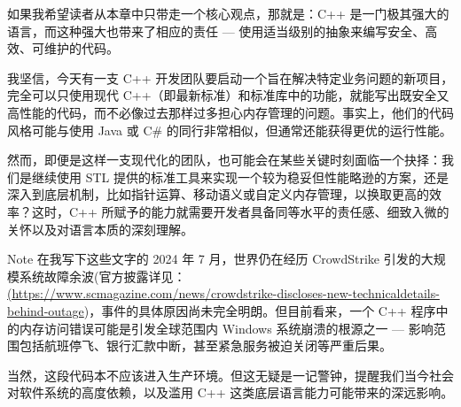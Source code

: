 如果我希望读者从本章中只带走一个核心观点，那就是：C++ 是一门极其强大的语言，而这种强大也带来了相应的责任 --- 使用适当级别的抽象来编写安全、高效、可维护的代码。

我坚信，今天有一支 C++ 开发团队要启动一个旨在解决特定业务问题的新项目，完全可以只使用现代 C++（即最新标准）和标准库中的功能，就能写出既安全又高性能的代码，而不必像过去那样过多担心内存管理的问题。事实上，他们的代码风格可能与使用 Java 或 C\# 的同行非常相似，但通常还能获得更优的运行性能。

然而，即便是这样一支现代化的团队，也可能会在某些关键时刻面临一个抉择：我们是继续使用 STL 提供的标准工具来实现一个较为稳妥但性能略逊的方案，还是深入到底层机制，比如指针运算、移动语义或自定义内存管理，以换取更高的效率？这时，C++ 所赋予的能力就需要开发者具备同等水平的责任感、细致入微的关怀以及对语言本质的深刻理解。

\begin{myNotic}{Note}
在我写下这些文字的 2024 年 7 月，世界仍在经历 CrowdStrike 引发的大规模系统故障余波(官方披露详见：\url{(https://www.scmagazine.com/news/crowdstrike-discloses-new-technicaldetails-behind-outage})，事件的具体原因尚未完全明朗。但目前看来，一个 C++ 程序中的内存访问错误可能是引发全球范围内 Windows 系统崩溃的根源之一 --- 影响范围包括航班停飞、银行汇款中断，甚至紧急服务被迫关闭等严重后果。

当然，这段代码本不应该进入生产环境。但这无疑是一记警钟，提醒我们当今社会对软件系统的高度依赖，以及滥用 C++ 这类底层语言能力可能带来的深远影响。
\end{myNotic}
